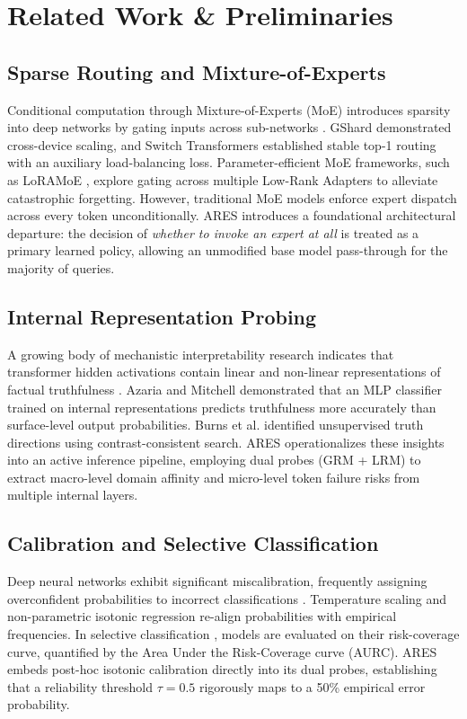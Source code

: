 \documentclass[journal,10pt,twocolumn]{IEEEtran}
\begin{document}
\section{Related Work \& Preliminaries}

\subsection{Sparse Routing and Mixture-of-Experts}
Conditional computation through Mixture-of-Experts (MoE) introduces sparsity into deep networks by gating inputs across sub-networks \cite{shazeer2017moe}. GShard \cite{lepikhin2021gshard} demonstrated cross-device scaling, and Switch Transformers \cite{fedus2022switch} established stable top-1 routing with an auxiliary load-balancing loss. Parameter-efficient MoE frameworks, such as LoRAMoE \cite{dou2023loramoe}, explore gating across multiple Low-Rank Adapters \cite{hu2022lora} to alleviate catastrophic forgetting. However, traditional MoE models enforce expert dispatch across every token unconditionally. ARES introduces a foundational architectural departure: the decision of \textit{whether to invoke an expert at all} is treated as a primary learned policy, allowing an unmodified base model pass-through for the majority of queries.

\subsection{Internal Representation Probing}
A growing body of mechanistic interpretability research indicates that transformer hidden activations contain linear and non-linear representations of factual truthfulness \cite{azaria2023internal, burns2023discovering, zou2023representation}. Azaria and Mitchell \cite{azaria2023internal} demonstrated that an MLP classifier trained on internal representations predicts truthfulness more accurately than surface-level output probabilities. Burns et al. \cite{burns2023discovering} identified unsupervised truth directions using contrast-consistent search. ARES operationalizes these insights into an active inference pipeline, employing dual probes (GRM + LRM) to extract macro-level domain affinity and micro-level token failure risks from multiple internal layers.

\subsection{Calibration and Selective Classification}
Deep neural networks exhibit significant miscalibration, frequently assigning overconfident probabilities to incorrect classifications \cite{guo2017calibration, minderer2021calibration}. Temperature scaling and non-parametric isotonic regression \cite{zadrozny2002transforming} re-align probabilities with empirical frequencies. In selective classification \cite{geifman2017selective}, models are evaluated on their risk-coverage curve, quantified by the Area Under the Risk-Coverage curve (AURC). ARES embeds post-hoc isotonic calibration directly into its dual probes, establishing that a reliability threshold $\tau = 0.5$ rigorously maps to a 50\% empirical error probability.
\end{document}

